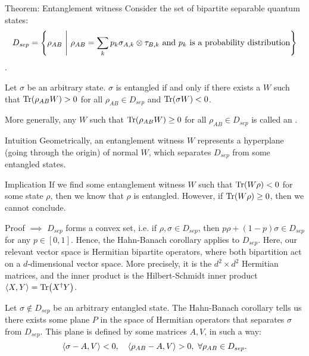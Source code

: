 \documentclass[a4paper]{article}
\begin{document}
\begin{parag}{Theorem: Entanglement witness}
    Consider the set of bipartite separable quantum states:
    \[D_{sep} = \left\{\rho_{AB} \suchthat \rho_{AB} = \sum_{k} p_k \sigma_{A, k} \otimes \tau_{B, k} \text{ and $p_k$ is a probability distribution}\right\}\].

    Let $\sigma$ be an arbitrary state. $\sigma$ is entangled if and only if there exists a $W$ such that $\Tr\left(\rho_{AB} W\right) > 0$ for all $\rho_{AB} \in D_{sep}$ and $\Tr\left(\sigma W\right) < 0$.

    More generally, any $W$ such that $\Tr\left(\rho_{AB} W\right) \geq 0$ for all $\rho_{AB} \in D_{sep}$ is called an .

    \begin{subparag}{Intuition}
        Geometrically, an entanglement witness $W$ represents a hyperplane (going through the origin) of normal $W$, which separates $D_{sep}$ from some entangled states.
    \end{subparag}

    \begin{subparag}{Implication}
        If we find some entanglement witness $W$ such that $\Tr\left(W \rho\right) < 0$ for some state $\rho$, then we know that $\rho$ is entangled. However, if $\Tr\left(W \rho\right) \geq 0$, then we cannot conclude.
    \end{subparag}

    \begin{subparag}{Proof $\implies$}
        $D_{sep}$ forms a convex set, i.e. if $\rho, \sigma \in D_{sep}$, then $p  \rho + \left(1-p\right)\sigma \in D_{sep}$ for any $p \in \left[0, 1\right]$. Hence, the Hahn-Banach corollary applies to $D_{sep}$. Here, our relevant vector space is Hermitian bipartite operators, where both bipartition act on a $d$-dimensional vector space. More precisely, it is the $d^2 \times d^2$ Hermitian matrices, and the inner product is the Hilbert-Schmidt inner product $\left\langle X, Y \right\rangle = \Tr\left(X^{\dagger} Y\right)$. 

        Let $\sigma \not\in D_{sep}$ be an arbitrary entangled state. The Hahn-Banach corollary tells us there exists some plane $P$ in the space of Hermitian operators that separates $\sigma$ from $D_{sep}$. This plane is defined by some matrices $A, V$, in such a way:
        \[\left\langle \sigma - A, V \right\rangle < 0, \mathspace \left\langle \rho_{AB}- A, V \right\rangle > 0,\  \forall \rho_{AB} \in D_{sep}.\]


\end{subparag}
\end{parag}
\end{document}
